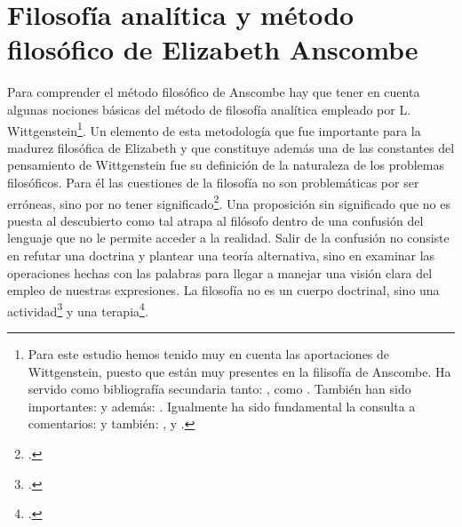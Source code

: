 \section{Filosofía analítica y método filosófico de Elizabeth Anscombe}


Para comprender el método filosófico de Anscombe hay que tener en cuenta algunas nociones básicas del método de filosofía analítica empleado por L. Wittgenstein\footnote{Para este estudio hemos tenido muy en cuenta las aportaciones de Wittgenstein, puesto que están muy presentes en la filisofía de Anscombe. Ha servido como bibliografía secundaria tanto: \cite{wittgenstein1922tractatuses}, como \cite{wittgenstein1953phiinv}. También han sido importantes: \cite{wittgenstein1969oncertes} y además: \cite{wittgenstein1956remmathes}. Igualmente ha sido fundamental la consulta a comentarios: \cite{anscombe1959iwt} y también: \cite{bakerhacker2009understanding}, \cite{bakerhacker2014rules} y \cite{hacker2000mind}.}. Un elemento de esta metodología que fue importante para la madurez filosófica de Elizabeth y que constituye además una de las constantes del pensamiento de Wittgenstein fue su definición de la naturaleza de los problemas filosóficos. Para él las cuestiones de la filosofía no son problemáticas por ser erróneas, sino por no tener significado\footcite[Cf.][\S4.003]{wittgenstein1922tractatuses}. Una proposición sin significado que no es puesta al descubierto como tal atrapa al filósofo dentro de una confusión del lenguaje que no le permite acceder a la realidad. Salir de la confusión no consiste en refutar una doctrina y plantear una teoría alternativa, sino en examinar las operaciones hechas con las palabras para llegar a manejar una visión clara del empleo de nuestras expresiones. La filosofía no es un cuerpo doctrinal, sino una actividad\footcite[Cf.][\S4.112]{wittgenstein1922tractatuses} y una terapia\footcite[Cf.][\S133]{wittgenstein1953phiinv}.

